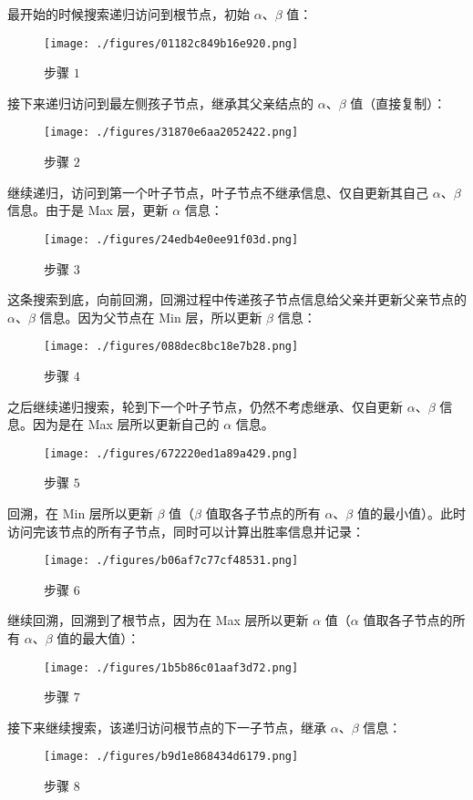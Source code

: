 最开始的时候搜索递归访问到根节点，初始 $\alpha$、$\beta$ 值：
\begin{figure}[ht]
\centering
\texttt{[image: ./figures/01182c849b16e920.png]}
\caption{步骤 $1$} \label{fig_mmsab_22}
\end{figure}
接下来递归访问到最左侧孩子节点，继承其父亲结点的 $\alpha$、$\beta$ 值（直接复制）：
\begin{figure}[ht]
\centering
\texttt{[image: ./figures/31870e6aa2052422.png]}
\caption{步骤 $2$} \label{fig_mmsab_23}
\end{figure}
继续递归，访问到第一个叶子节点，叶子节点不继承信息、仅自更新其自己 $\alpha$、$\beta$ 信息。由于是 Max 层，更新 $\alpha$ 信息：
\begin{figure}[ht]
\centering
\texttt{[image: ./figures/24edb4e0ee91f03d.png]}
\caption{步骤 $3$} \label{fig_mmsab_25}
\end{figure}
这条搜索到底，向前回溯，回溯过程中传递孩子节点信息给父亲并更新父亲节点的 $\alpha$、$\beta$ 信息。因为父节点在 Min 层，所以更新 $\beta$ 信息：
\begin{figure}[ht]
\centering
\texttt{[image: ./figures/088dec8bc18e7b28.png]}
\caption{步骤 $4$} \label{fig_mmsab_26}
\end{figure}
之后继续递归搜索，轮到下一个叶子节点，仍然不考虑继承、仅自更新 $\alpha$、$\beta$ 信息。因为是在 Max 层所以更新自己的 $\alpha$ 信息。
\begin{figure}[ht]
\centering
\texttt{[image: ./figures/672220ed1a89a429.png]}
\caption{步骤 $5$} \label{fig_mmsab_27}
\end{figure}
回溯，在 Min 层所以更新 $\beta$ 值（$\beta$ 值取各子节点的所有 $\alpha$、$\beta$ 值的最小值）。此时访问完该节点的所有子节点，同时可以计算出胜率信息并记录：
\begin{figure}[ht]
\centering
\texttt{[image: ./figures/b06af7c77cf48531.png]}
\caption{步骤 $6$} \label{fig_mmsab_28}
\end{figure}
继续回溯，回溯到了根节点，因为在 Max 层所以更新 $\alpha$ 值（$\alpha$ 值取各子节点的所有 $\alpha$、$\beta$ 值的最大值）：
\begin{figure}[ht]
\centering
\texttt{[image: ./figures/1b5b86c01aaf3d72.png]}
\caption{步骤 $7$} \label{fig_mmsab_38}
\end{figure}
接下来继续搜索，该递归访问根节点的下一子节点，继承 $\alpha$、$\beta$ 信息：
\begin{figure}[ht]
\centering
\texttt{[image: ./figures/b9d1e868434d6179.png]}
\caption{步骤 $8$} \label{fig_mmsab_39}
\end{figure}
